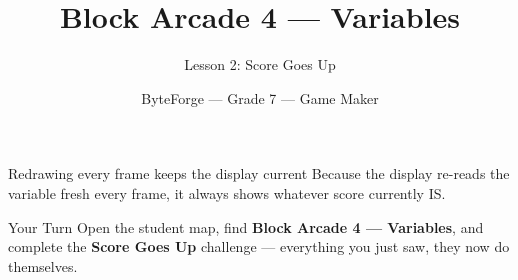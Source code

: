\documentclass[aspectratio=169]{beamer}
\title{Block Arcade 4 — Variables}
\subtitle{Lesson 2: Score Goes Up}
\author{ByteForge --- Grade 7 --- Game Maker}
\date{}
\begin{document}
\begin{frame}
    \titlepage
\end{frame}

\begin{frame}{Redrawing every frame keeps the display current}
    \Large
    Because the display re-reads the variable fresh every frame, it always shows whatever score currently IS.
\end{frame}

\begin{frame}{Your Turn}
    \Large
    Open the student map, find \textbf{Block Arcade 4 — Variables}, and complete
    the \textbf{Score Goes Up} challenge --- everything you just saw, they now do themselves.
\end{frame}
\end{document}
